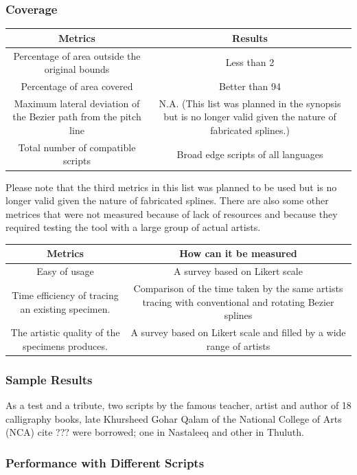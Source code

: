 \subsubsection{Coverage}
\begin{tabular}{|c|c|}
  \hline
Metrics & Results \\
  \hline
Percentage of area outside the original bounds & Less than 2 \\
Percentage of area covered&Better than 94 \\
Maximum lateral deviation of the Bezier path from the pitch line & N.A. (This list was planned in the synopsis but is no longer valid given the nature of fabricated splines.) \\
Total number of compatible scripts & Broad edge scripts of all languages \\
  \hline
\end{tabular}

Please note that the third metrics in this list was planned to be used but is no longer valid given the nature of fabricated splines.
There are also some other metrices that were not measured because of lack of resources and because they required testing the tool with a large group of actual artists.
\begin{tabular}{|c|c|}
  \hline
  Metrics & How can it be measured \\
  \hline
Easy of usage & A survey based on Likert scale \\
Time efficiency of tracing an existing specimen. & Comparison of the time taken by the same artists tracing with conventional and rotating Bezier splines \\
The artistic quality of the specimens produces. & A survey based on Likert scale and filled by a wide range of artists \\
\end{tabular}

\subsubsection{Sample Results}
As a test and a tribute, two scripts by the famous teacher, artist and author of 18 calligraphy books, late Khursheed Gohar Qalam of the National College of Arts (NCA) cite ??? were borrowed; one in Nastaleeq and other in Thuluth.

\subsubsection{Performance with Different Scripts} 